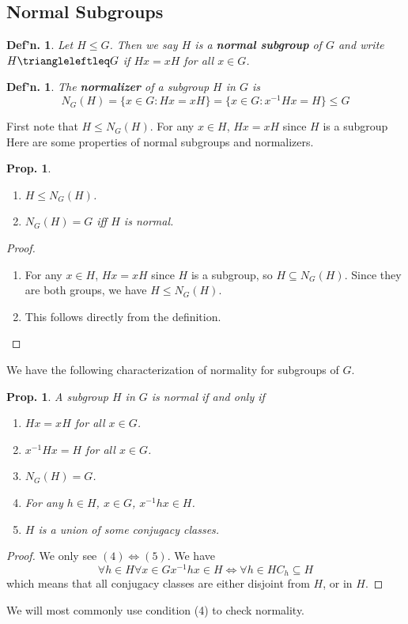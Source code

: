 \documentclass[12pt, a4paper]{book}
\newtheorem{definition}[theorem]{Def'n.}
\newtheorem{proposition}[theorem]{Prop.}
\theoremstyle{nonumberplain}
\newtheorem{proof}{Proof}
\begin{document}
\subsection{Normal Subgroups}
\begin{definition}
    Let $H\leq G$.
    Then we say $H$ is a \textbf{normal subgroup} of $G$ and write $H\triangleleftleq G$ if $Hx=xH$ for all $x\in G$.
\end{definition}
\begin{definition}
    The \textbf{normalizer} of a subgroup $H$ in $G$ is
    \[N_G(H)=\{x\in G:Hx=xH\}=\{x\in G:x^{-1}Hx=H\}\leq G\]
\end{definition}
First note that $H\leq N_G(H)$.
For any $x\in H$, $Hx=xH$ since $H$ is a subgroup
Here are some properties of normal subgroups and normalizers.
\begin{proposition}
    \begin{enumerate}
        \item $H\leq N_G(H)$.
        \item $N_G(H)=G$ iff $H$ is normal.
    \end{enumerate}
\end{proposition}
\begin{proof}
    \begin{enumerate}
        \item For any $x\in H$, $Hx=xH$ since $H$ is a subgroup, so $H\subseteq N_G(H)$.
            Since they are both groups, we have $H\leq N_G(H)$.
        \item This follows directly from the definition.
    \end{enumerate}
\end{proof}
We have the following characterization of normality for subgroups of $G$.
\begin{proposition}
    A subgroup $H$ in $G$ is normal if and only if
    \begin{enumerate}
        \item $Hx=xH$ for all $x\in G$.
        \item $x^{-1}Hx=H$ for all $x\in G$.
        \item $N_G(H)=G$.
        \item For any $h\in H$, $x\in G$, $x^{-1}hx\in H$.
        \item $H$ is a union of some conjugacy classes.
    \end{enumerate}
\end{proposition}
\begin{proof}
    We only see $(4)\Leftrightarrow (5)$.
    We have
    \[\forall h\in H\forall x\in G x^{-1}hx\in H\Leftrightarrow\forall h\in H C_h\subseteq H\]
    which means that all conjugacy classes are either disjoint from $H$, or in $H$.
\end{proof}
We will most commonly use condition (4) to check normality.
\end{document}
